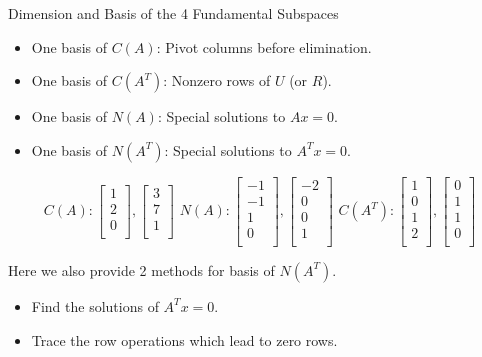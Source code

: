 \documentclass{beamer}
\begin{document}
\begin{frame}{Dimension and Basis of the 4 Fundamental Subspaces}
\begin{itemize}
    \item One basis of $C(A)$: Pivot columns before elimination.
    \item One basis of $C(A^T)$: Nonzero rows of $U$ (or $R$).
    \item One basis of $N(A)$: Special solutions to $Ax=0$.
    \item One basis of $N(A^T)$: Special solutions to $A^Tx=0$.
\end{itemize}
    \begin{equation*}
        C\left( A \right) :\left[ \begin{array}{c}
            1\\
            2\\
            0\\
        \end{array} \right] ,\left[ \begin{array}{c}
            3\\
            7\\
            1\\
        \end{array} \right] \,\, N\left( A \right) :\left[ \begin{array}{c}
            -1\\
            -1\\
            1\\
            0\\
        \end{array} \right] ,\left[ \begin{array}{c}
            -2\\
            0\\
            0\\
            1\\
        \end{array} \right] \,\,C\left( A^T \right) :\left[ \begin{array}{c}
            1\\
            0\\
            1\\
            2\\
        \end{array} \right] ,\left[ \begin{array}{c}
            0\\
            1\\
            1\\
            0\\
        \end{array} \right]
    \end{equation*}

Here we also provide 2 methods for basis of $N(A^T)$.
\begin{itemize}
    \item Find the solutions of $A^Tx=0$.
    \item Trace the row operations which lead to zero rows.
\end{itemize}
\end{frame}
\end{document}
